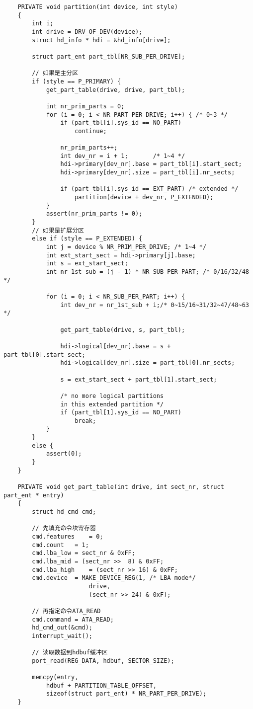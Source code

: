 \documentclass[a4paper,left=2.5cm,right=2.5cm,11pt]{article}
\begin{document}
	\begin{lstlisting}
	PRIVATE void partition(int device, int style)
	{
		int i;
		int drive = DRV_OF_DEV(device);
		struct hd_info * hdi = &hd_info[drive];

		struct part_ent part_tbl[NR_SUB_PER_DRIVE];

		// 如果是主分区
		if (style == P_PRIMARY) {
			get_part_table(drive, drive, part_tbl);

			int nr_prim_parts = 0;
			for (i = 0; i < NR_PART_PER_DRIVE; i++) { /* 0~3 */
				if (part_tbl[i].sys_id == NO_PART) 
					continue;

				nr_prim_parts++;
				int dev_nr = i + 1;		  /* 1~4 */
				hdi->primary[dev_nr].base = part_tbl[i].start_sect;
				hdi->primary[dev_nr].size = part_tbl[i].nr_sects;

				if (part_tbl[i].sys_id == EXT_PART) /* extended */
					partition(device + dev_nr, P_EXTENDED);
			}
			assert(nr_prim_parts != 0);
		}
		// 如果是扩展分区
		else if (style == P_EXTENDED) {
			int j = device % NR_PRIM_PER_DRIVE; /* 1~4 */
			int ext_start_sect = hdi->primary[j].base;
			int s = ext_start_sect;
			int nr_1st_sub = (j - 1) * NR_SUB_PER_PART; /* 0/16/32/48 */

			for (i = 0; i < NR_SUB_PER_PART; i++) {
				int dev_nr = nr_1st_sub + i;/* 0~15/16~31/32~47/48~63 */

				get_part_table(drive, s, part_tbl);

				hdi->logical[dev_nr].base = s + part_tbl[0].start_sect;
				hdi->logical[dev_nr].size = part_tbl[0].nr_sects;

				s = ext_start_sect + part_tbl[1].start_sect;

				/* no more logical partitions
				in this extended partition */
				if (part_tbl[1].sys_id == NO_PART)
					break;
			}
		}
		else {
			assert(0);
		}
	}

	PRIVATE void get_part_table(int drive, int sect_nr, struct part_ent * entry)
	{
		struct hd_cmd cmd;

		// 先填充命令块寄存器
		cmd.features	= 0;
		cmd.count	= 1;
		cmd.lba_low	= sect_nr & 0xFF;
		cmd.lba_mid	= (sect_nr >>  8) & 0xFF;
		cmd.lba_high	= (sect_nr >> 16) & 0xFF;
		cmd.device	= MAKE_DEVICE_REG(1, /* LBA mode*/
						drive,
						(sect_nr >> 24) & 0xF);
		
		// 再指定命令ATA_READ
		cmd.command	= ATA_READ;
		hd_cmd_out(&cmd);
		interrupt_wait();

		// 读取数据到hdbuf缓冲区
		port_read(REG_DATA, hdbuf, SECTOR_SIZE);

		memcpy(entry,
			hdbuf + PARTITION_TABLE_OFFSET,
			sizeof(struct part_ent) * NR_PART_PER_DRIVE);
	}
	\end{lstlisting}
\end{document}
